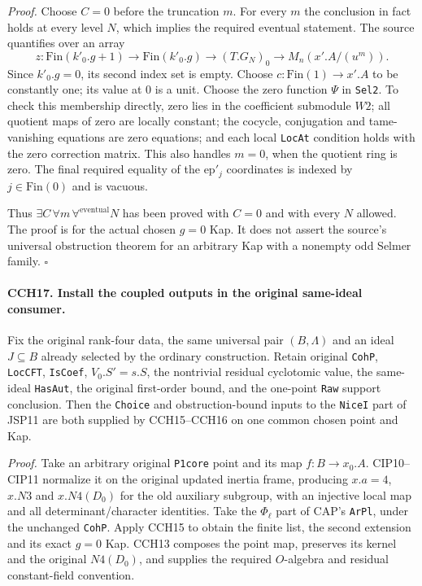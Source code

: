 \emph{Proof.}
Choose $C=0$ before the truncation $m$.  For every $m$ the
conclusion in fact holds at every level $N$, which implies
the required eventual statement.
The source quantifies over an array
\[
 z:\mathrm{Fin}(k'_0.g+1)\to\mathrm{Fin}(k'_0.g)
       \to(T.G_N)_0\to M_n(x'.A/(u^m)).
\]
Since $k'_0.g=0$, its second index set is empty.  Choose
$c:\mathrm{Fin}(1)\to x'.A$ to be constantly one; its value
at $0$ is a unit.  Choose the zero function $\Psi$ in
\texttt{Sel2}.  To check this membership directly, zero
lies in the coefficient submodule $W2$; all quotient maps
of zero are locally constant; the cocycle, conjugation and
tame-vanishing equations are zero equations; and each local
\texttt{LocAt} condition holds with the zero correction
matrix.  This also handles $m=0$, when the quotient ring is zero.
The final required equality of the $\mathrm{ep}'_j$ coordinates
is indexed by $j\in\mathrm{Fin}(0)$ and is vacuous.

Thus $\exists C\,\forall m\,\forall^{\mathrm{eventual}}N$
has been proved with $C=0$ and with every $N$ allowed.
The proof is for the actual chosen $g=0$ Kap.  It does not
assert the source's universal obstruction theorem for an
arbitrary Kap with a nonempty odd Selmer family.
\hfill$\square$

\paragraph{CCH17. Install the coupled outputs in the original same-ideal consumer.}
\label{claim:CCH17}
Fix the original rank-four data, the same universal pair
$(B,\Lambda)$ and an ideal $J\subseteq B$ already selected
by the ordinary construction.  Retain original \texttt{CohP},
\texttt{LocCFT}, \texttt{IsCoef}, $V_0.S'=s.S$, the
nontrivial residual cyclotomic value, the same-ideal
\texttt{HasAut}, the original first-order bound, and the
one-point \texttt{Raw} support conclusion.
Then the \texttt{Choice} and obstruction-bound inputs to
the \texttt{NiceI} part of JSP11 are both supplied by
CCH15--CCH16 on one common chosen point and Kap.

\emph{Proof.}
Take an arbitrary original \texttt{P1core} point and its map
$f:B\to x_0.A$.  CIP10--CIP11 normalize it on the original
updated inertia frame, producing $x.a=4$, $x.N3$ and
$x.N4(D_0)$ for the old auxiliary subgroup, with an
injective local map and all determinant/character identities.
Take the $\Phi_\ell$ part of CAP's \texttt{ArPl}, under the
unchanged \texttt{CohP}.  Apply CCH15 to obtain the finite
list, the second extension and its exact $g=0$ Kap.
CCH13 composes the point map, preserves its kernel and the
original $N4(D_0)$, and supplies the required $O$-algebra
and residual constant-field convention.

